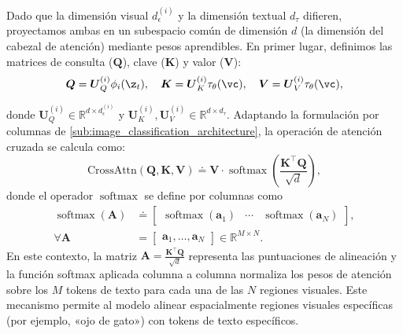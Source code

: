 \documentclass[../../book-main_es.tex]{subfiles}
\begin{document}
\begin{itemize}
          Dado que la dimensión visual $d_\epsilon^{(i)}$ y la dimensión textual $d_\tau$ difieren, proyectamos 
          ambas en un subespacio común de dimensión $d$ (la dimensión del cabezal de atención) mediante pesos 
          aprendibles. En primer lugar, definimos las matrices de consulta ($\boldsymbol{Q}$), 
          clave ($\boldsymbol{K}$) y valor ($\boldsymbol{V}$):
          \begin{equation}
              \boldsymbol{Q} = \boldsymbol{U}^{(i)}_{Q} \phi_i(\z_t), \quad
              \boldsymbol{K} = \boldsymbol{U}^{(i)}_{K} \tau_\theta(\vc), \quad
              \boldsymbol{V} = \boldsymbol{U}^{(i)}_{V} \tau_\theta(\vc),
          \end{equation}

          donde $\boldsymbol{U}^{(i)}_{Q} \in \mathbb{R}^{d \times d_\epsilon^{(i)}}$ y 
          $\boldsymbol{U}^{(i)}_{K}, \boldsymbol{U}^{(i)}_{V} \in \mathbb{R}^{d \times d_\tau}$. 
          Adaptando la formulación por columnas de \eqref{sub:image_classification_architecture}, 
          la operación de atención cruzada se calcula como:
          \begin{equation}
              \text{CrossAttn}(\boldsymbol{Q}, \boldsymbol{K}, \boldsymbol{V}) \doteq \boldsymbol{V} \cdot \operatorname{softmax}\left( \frac{\boldsymbol{K}^\top \boldsymbol{Q}}{\sqrt{d}} \right),
          \end{equation}
          donde el operador $\operatorname{softmax}$ se define por columnas como
          \begin{align}
              \operatorname{softmax}(\boldsymbol{A})
              &\doteq 
              \begin{bmatrix} \operatorname{softmax}(\boldsymbol{a}_{1}) & 
                  \cdots & \operatorname{softmax}(\boldsymbol{a}_{N}) 
              \end{bmatrix}, \\
              \forall \boldsymbol{A}
              &= 
              \begin{bmatrix} \boldsymbol{a}_{1}, \dots, \boldsymbol{a}_{N} 
              \end{bmatrix} \in \mathbb{R}^{M \times N}.
          \end{align}
          En este contexto, la matriz $\boldsymbol{A} = \frac{\boldsymbol{K}^\top \boldsymbol{Q}}{\sqrt{d}}$ 
          representa las puntuaciones de alineación y la función softmax aplicada columna a columna normaliza los pesos de 
          atención sobre los $M$ tokens de texto para cada una de las $N$ regiones visuales. Este mecanismo 
          permite al modelo alinear espacialmente regiones visuales específicas (por ejemplo, «ojo de gato») 
          con tokens de texto específicos.
\end{itemize}
\end{document}
